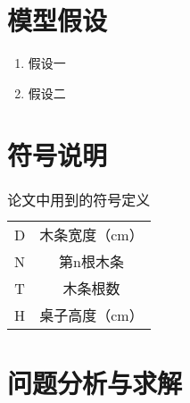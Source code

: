 \documentclass[bwprint]{gmcmthesis}
\begin{document}
\FloatBarrier
\section{模型假设}


\begin{enumerate}[itemindent=20pt]
	\item 假设一
	\item 假设二
\end{enumerate}


\FloatBarrier
\section{符号说明}


\begin{table}[hp]
    \centering
    \caption{论文中用到的符号定义}
	\begin{tabular}{cc}
	\toprule
	 \makebox[0.4\textwidth][c]{符号}	&  \makebox[0.5\textwidth][c]{意义} \\ 
	 \midrule
	 D	    & 木条宽度（cm）  \\
	 N	    & 第n根木条  \\ 
	   \midrule
	 T	    & 木条根数  \\
	 H	    & 桌子高度（cm）  \\
	 \bottomrule
	\end{tabular}
    \label{tab:addlabel}%
\end{table}%






\FloatBarrier
\section{问题分析与求解}
\FloatBarrier
\end{document}

